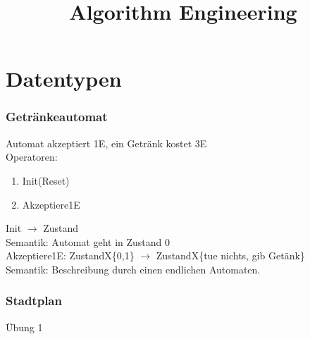 \documentclass[a4paper]{article}
\begin{document}
\title{Algorithm Engineering}
\maketitle
\section*{Datentypen}

\subsubsection*{Getränkeautomat}
Automat akzeptiert 1E, ein Getränk kostet 3E\\
Operatoren:
\begin{enumerate}
\item Init(Reset)
\item Akzeptiere1E
\end{enumerate}
Init $\rightarrow$ Zustand\\
\hspace*{0.5cm}Semantik: Automat geht in Zustand 0\\
Akzeptiere1E: ZustandX\{0,1\} $\rightarrow$ ZustandX\{tue nichts, gib Getänk\}\\
\hspace*{0.5cm}Semantik: Beschreibung durch einen endlichen Automaten.
\subsubsection*{Stadtplan}
Übung 1
\end{document}
